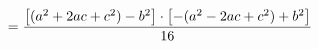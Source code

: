 \documentclass[preview]{standalone}
\begin{document}
\begin{align*}
\special{dvisvgm:raw <g id='unique000'>}= \frac{\bigl[(a^2+2ac+c^2)-b^2\bigr]\cdot\bigl[-({a^2-2ac+c^2})+b^2\bigr]}{16}\special{dvisvgm:raw </g>}
\end{align*}
\end{document}
